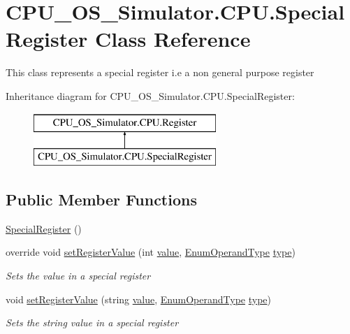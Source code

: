 \hypertarget{class_c_p_u___o_s___simulator_1_1_c_p_u_1_1_special_register}{}\section{C\+P\+U\+\_\+\+O\+S\+\_\+\+Simulator.\+C\+P\+U.\+Special\+Register Class Reference}
\label{class_c_p_u___o_s___simulator_1_1_c_p_u_1_1_special_register}


This class represents a special register i.\+e a non general purpose register  


Inheritance diagram for C\+P\+U\+\_\+\+O\+S\+\_\+\+Simulator.\+C\+P\+U.\+Special\+Register\+:\begin{figure}[H]
\begin{center}
\leavevmode
\includegraphics[height=2.000000cm]{class_c_p_u___o_s___simulator_1_1_c_p_u_1_1_special_register}
\end{center}
\end{figure}
\subsection*{Public Member Functions}
\begin{DoxyCompactItemize}
\item 
\hyperlink{class_c_p_u___o_s___simulator_1_1_c_p_u_1_1_special_register_a697f3e6f938ad7ab0ceee0555fe2c312}{Special\+Register} ()
\item 
override void \hyperlink{class_c_p_u___o_s___simulator_1_1_c_p_u_1_1_special_register_a5c5fc9c6ff3dac3537a5f6ca2cfdd114}{set\+Register\+Value} (int \hyperlink{class_c_p_u___o_s___simulator_1_1_c_p_u_1_1_special_register_a040dbed0c42c3a45ccb7b01d181dd829}{value}, \hyperlink{namespace_c_p_u___o_s___simulator_1_1_c_p_u_ad49cfe442b74115a326c03b7ae848f76}{Enum\+Operand\+Type} \hyperlink{class_c_p_u___o_s___simulator_1_1_c_p_u_1_1_special_register_aae2bca6c1354013cca156bd19c30640d}{type})
\begin{DoxyCompactList}\small\item\em Sets the value in a special register \end{DoxyCompactList}\item 
void \hyperlink{class_c_p_u___o_s___simulator_1_1_c_p_u_1_1_special_register_a6c2605883e6349c10e92f5453c2ad9ea}{set\+Register\+Value} (string \hyperlink{class_c_p_u___o_s___simulator_1_1_c_p_u_1_1_special_register_a040dbed0c42c3a45ccb7b01d181dd829}{value}, \hyperlink{namespace_c_p_u___o_s___simulator_1_1_c_p_u_ad49cfe442b74115a326c03b7ae848f76}{Enum\+Operand\+Type} \hyperlink{class_c_p_u___o_s___simulator_1_1_c_p_u_1_1_special_register_aae2bca6c1354013cca156bd19c30640d}{type})
\begin{DoxyCompactList}\small\item\em Sets the string value in a special register \end{DoxyCompactList}\end{DoxyCompactItemize}
